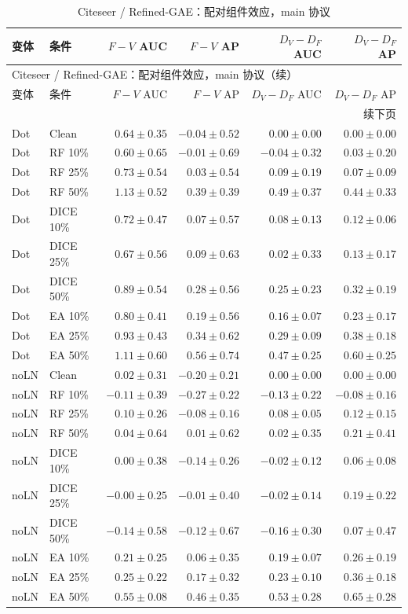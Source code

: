 {\footnotesize
\setlength{\tabcolsep}{3.2pt}
\renewcommand{\arraystretch}{1.10}
\begin{longtable}{llrrrr}
\caption{Citeseer / Refined-GAE：配对组件效应，main 协议}\\
\toprule
变体 & 条件 & $F-V$ AUC & $F-V$ AP & $D_V-D_F$ AUC & $D_V-D_F$ AP \\
\midrule
\endfirsthead
\multicolumn{6}{l}{Citeseer / Refined-GAE：配对组件效应，main 协议（续）}\\
\toprule
变体 & 条件 & $F-V$ AUC & $F-V$ AP & $D_V-D_F$ AUC & $D_V-D_F$ AP \\
\midrule
\endhead
\midrule\multicolumn{6}{r}{续下页}\\
\endfoot
\bottomrule
\endlastfoot
Dot & Clean & $0.64\pm0.35$ & $-0.04\pm0.52$ & $0.00\pm0.00$ & $0.00\pm0.00$ \\
Dot & RF 10\% & $0.60\pm0.65$ & $-0.01\pm0.69$ & $-0.04\pm0.32$ & $0.03\pm0.20$ \\
Dot & RF 25\% & $0.73\pm0.54$ & $0.03\pm0.54$ & $0.09\pm0.19$ & $0.07\pm0.09$ \\
Dot & RF 50\% & $1.13\pm0.52$ & $0.39\pm0.39$ & $0.49\pm0.37$ & $0.44\pm0.33$ \\
Dot & DICE 10\% & $0.72\pm0.47$ & $0.07\pm0.57$ & $0.08\pm0.13$ & $0.12\pm0.06$ \\
Dot & DICE 25\% & $0.67\pm0.56$ & $0.09\pm0.63$ & $0.02\pm0.33$ & $0.13\pm0.17$ \\
Dot & DICE 50\% & $0.89\pm0.54$ & $0.28\pm0.56$ & $0.25\pm0.23$ & $0.32\pm0.19$ \\
Dot & EA 10\% & $0.80\pm0.41$ & $0.19\pm0.56$ & $0.16\pm0.07$ & $0.23\pm0.17$ \\
Dot & EA 25\% & $0.93\pm0.43$ & $0.34\pm0.62$ & $0.29\pm0.09$ & $0.38\pm0.18$ \\
Dot & EA 50\% & $1.11\pm0.60$ & $0.56\pm0.74$ & $0.47\pm0.25$ & $0.60\pm0.25$ \\
noLN & Clean & $0.02\pm0.31$ & $-0.20\pm0.21$ & $0.00\pm0.00$ & $0.00\pm0.00$ \\
noLN & RF 10\% & $-0.11\pm0.39$ & $-0.27\pm0.22$ & $-0.13\pm0.22$ & $-0.08\pm0.16$ \\
noLN & RF 25\% & $0.10\pm0.26$ & $-0.08\pm0.16$ & $0.08\pm0.05$ & $0.12\pm0.15$ \\
noLN & RF 50\% & $0.04\pm0.64$ & $0.01\pm0.62$ & $0.02\pm0.35$ & $0.21\pm0.41$ \\
noLN & DICE 10\% & $0.00\pm0.38$ & $-0.14\pm0.26$ & $-0.02\pm0.12$ & $0.06\pm0.08$ \\
noLN & DICE 25\% & $-0.00\pm0.25$ & $-0.01\pm0.40$ & $-0.02\pm0.14$ & $0.19\pm0.22$ \\
noLN & DICE 50\% & $-0.14\pm0.58$ & $-0.12\pm0.67$ & $-0.16\pm0.30$ & $0.07\pm0.47$ \\
noLN & EA 10\% & $0.21\pm0.25$ & $0.06\pm0.35$ & $0.19\pm0.07$ & $0.26\pm0.19$ \\
noLN & EA 25\% & $0.25\pm0.22$ & $0.17\pm0.32$ & $0.23\pm0.10$ & $0.36\pm0.18$ \\
noLN & EA 50\% & $0.55\pm0.08$ & $0.46\pm0.35$ & $0.53\pm0.28$ & $0.65\pm0.28$ \\
\end{longtable}
}


